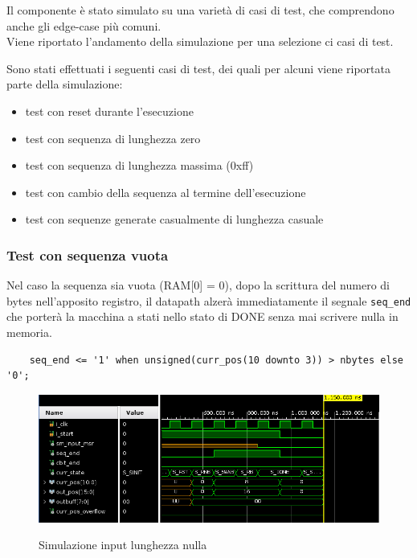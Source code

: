 \documentclass[12pt, a4paper]{article}
\begin{document}
Il componente è stato simulato su una varietà di casi di test, che comprendono anche
gli edge-case più comuni.\\
Viene riportato l'andamento della simulazione per una selezione ci casi di test.

\noindent Sono stati effettuati i seguenti casi di test, dei quali per alcuni viene riportata parte della simulazione: %

\begin{itemize}[itemsep=4pt, topsep=4pt]
    \item test con reset durante l'esecuzione
    \item test con sequenza di lunghezza zero
    \item test con sequenza di lunghezza massima (0xff)
    \item test con cambio della sequenza al termine dell'esecuzione
    \item test con sequenze generate casualmente di lunghezza casuale
\end{itemize}

\pagebreak

\subsubsection{Test con sequenza vuota}

Nel caso la sequenza sia vuota (RAM[0] = 0), dopo la scrittura del numero di bytes nell'apposito registro,
il datapath alzerà immediatamente il segnale \texttt{seq\_end} che porterà la macchina a stati
nello stato di DONE senza mai scrivere nulla in memoria.

\begin{verbatim}
    seq_end <= '1' when unsigned(curr_pos(10 downto 3)) > nbytes else '0';
\end{verbatim}

\begin{figure}[h!]
    \centering
    \includegraphics[scale=0.5]{sim_minlen_init.png}
    \label{img:sim_min_init}
    \caption{Simulazione input lunghezza nulla}
\end{figure}
\end{document}
